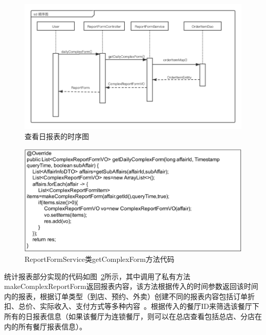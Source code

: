 \begin{figure}[htbp!]
    \centering
    \includegraphics[width=5in]{FIGs/chapter4/table_time.pdf}
    \caption{查看日报表的时序图}\label{fig_table_time}
\end{figure}

\begin{figure}[htbp!]
    \centering
    \includegraphics[width=5in]{FIGs/chapter4/6.pdf}
    \caption{ReportFormService类getComplexForm方法代码}\label{fig_table_6}
\end{figure}

统计报表部分实现的代码如图~\ref{fig_table_6}所示，其中调用了私有方法makeComplexReportForm返回报表内容，该方法根据传入的时间参数返回该时间内的报表，根据订单类型（到店、预约、外卖）创建不同的报表内容包括订单折扣、总价、实际收入、支付方式等多种内容~\cite{lz2019}。根据传入的餐厅ID来筛选该餐厅下所有的日报表信息（如果该餐厅为连锁餐厅，则可以在总店查看包括总店、分店在内的所有餐厅报表信息）。


